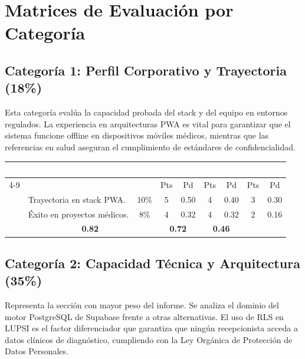 \documentclass[a4paper,12pt]{article}
\renewcommand{\arraystretch}{1.1}
\begin{document}
\section{Matrices de Evaluación por Categoría}

\subsection{Categoría 1: Perfil Corporativo y Trayectoria (18\%)}
Esta categoría evalúa la capacidad probada del stack y del equipo en entornos regulados. La experiencia en arquitecturas PWA es vital para garantizar que el sistema funcione offline en dispositivos móviles médicos, mientras que las referencias en salud aseguran el cumplimiento de estándares de confidencialidad.

\begin{table}[H]
\centering
\small
\renewcommand{\arraystretch}{1.5}
\begin{tabularx}{\linewidth}{|p{1.5cm}|X|c|c|c|c|c|c|c|}
\hline
\rowcolor{SKTPrimary} \textcolor{white}{\textbf{ID}} & \textcolor{white}{\textbf{CRITERIO}} & \textcolor{white}{\textbf{\%}} & \multicolumn{2}{c|}{\textcolor{white}{\textbf{PROP 1}}} & \multicolumn{2}{c|}{\textcolor{white}{\textbf{PROP 2}}} & \multicolumn{2}{c|}{\textcolor{white}{\textbf{PROP 3}}} \\ \cline{4-9}
& & & Pts & Pd & Pts & Pd & Pts & Pd \\ \hline
[EXP] & Trayectoria en stack PWA. & 10\% & 5 & 0.50 & 4 & 0.40 & 3 & 0.30 \\ \hline
[REF] & Éxito en proyectos médicos. & 8\% & 4 & 0.32 & 4 & 0.32 & 2 & 0.16 \\ \hline
\rowcolor{catCorp} \multicolumn{3}{|c|}{\textbf{SUBTOTAL CATEGORÍA}} & \multicolumn{2}{c|}{\textbf{0.82}} & \multicolumn{2}{c|}{\textbf{0.72}} & \multicolumn{2}{c|}{\textbf{0.46}} \\ \hline
\end{tabularx}
\end{table}

\subsection{Categoría 2: Capacidad Técnica y Arquitectura (35\%)}
Representa la sección con mayor peso del informe. Se analiza el dominio del motor PostgreSQL de Supabase frente a otras alternativas. El uso de RLS en LUPSI es el factor diferenciador que garantiza que ningún recepcionista acceda a datos clínicos de diagnóstico, cumpliendo con la Ley Orgánica de Protección de Datos Personales.
\end{document}
